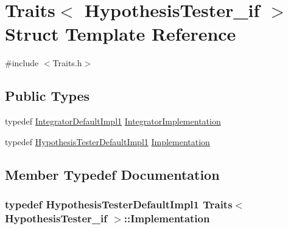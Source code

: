 \hypertarget{struct_traits_3_01_hypothesis_tester__if_01_4}{}\section{Traits$<$ Hypothesis\+Tester\+\_\+if $>$ Struct Template Reference}
\label{struct_traits_3_01_hypothesis_tester__if_01_4}


{\ttfamily \#include $<$Traits.\+h$>$}

\subsection*{Public Types}
\begin{DoxyCompactItemize}
\item 
typedef \hyperlink{class_integrator_default_impl1}{Integrator\+Default\+Impl1} \hyperlink{struct_traits_3_01_hypothesis_tester__if_01_4_aaf49116dcf746abac55182bcdecee2e2}{Integrator\+Implementation}
\item 
typedef \hyperlink{class_hypothesis_tester_default_impl1}{Hypothesis\+Tester\+Default\+Impl1} \hyperlink{struct_traits_3_01_hypothesis_tester__if_01_4_a7135feb821881318c06185f7bab73a51}{Implementation}
\end{DoxyCompactItemize}


\subsection{Member Typedef Documentation}
\subsubsection[{\texorpdfstring{Implementation}{Implementation}}]{\setlength{\rightskip}{0pt plus 5cm}typedef {\bf Hypothesis\+Tester\+Default\+Impl1} {\bf Traits}$<$ {\bf Hypothesis\+Tester\+\_\+if} $>$\+::{\bf Implementation}}\hypertarget{struct_traits_3_01_hypothesis_tester__if_01_4_a7135feb821881318c06185f7bab73a51}{}\label{struct_traits_3_01_hypothesis_tester__if_01_4_a7135feb821881318c06185f7bab73a51}

